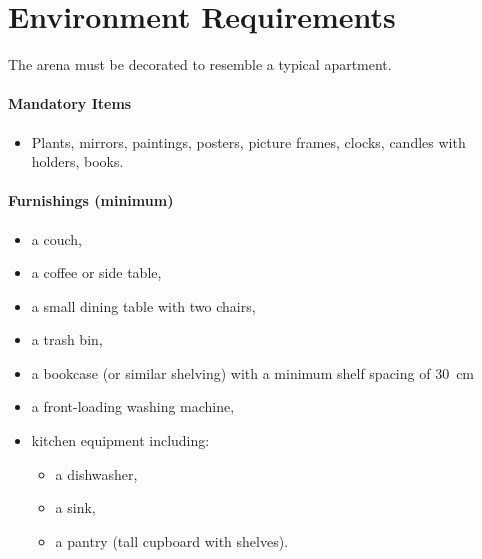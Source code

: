 \section{Environment Requirements}

The arena must be decorated to resemble a typical apartment.
\paragraph{Mandatory Items}
\begin{itemize}
    \item Plants, mirrors, paintings, posters, picture frames, clocks, candles with holders, books.
\end{itemize}

\paragraph{Furnishings (minimum)}
\begin{itemize}
    \item a couch,
    \item a coffee or side table,
    \item a small dining table with two chairs,
    \item a trash bin,
    \item a bookcase (or similar shelving) with a minimum shelf spacing of \qty{30}{\centi\metre}
    \item a front-loading washing machine,
    \item kitchen equipment including:
    \begin{itemize}
        \item a dishwasher,
        \item a sink,
        \item a pantry (tall cupboard with shelves).
    \end{itemize}
\end{itemize}

